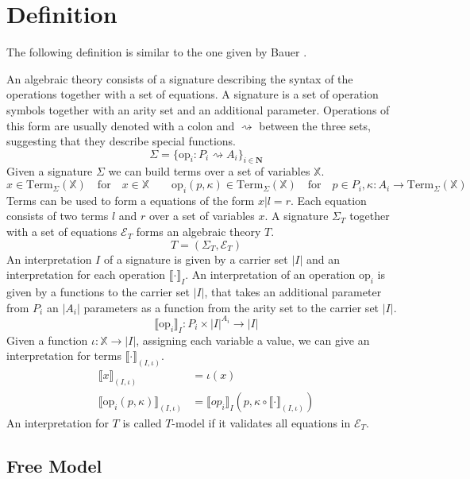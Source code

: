 \section{Definition}
\label{fo-definition}

The following definition is similar to the one given by Bauer
\cite{DBLP:journals/corr/abs-1807-05923}.

An algebraic theory consists of a signature describing the syntax of the
operations together with a set of equations.
A signature is a set of operation symbols together with an arity set and an
additional parameter.
Operations of this form are usually denoted with a colon and $\rightsquigarrow$
between the three sets, suggesting that they describe special functions.
\[
  \Sigma = \{ \mathrm{op}_i : P_i \rightsquigarrow A_i  \}_{i\in \mathbf{N}}
\]
Given a signature $\Sigma$ we can build terms over a set of variables $\mathbb{X}$.
\[
  x \in \mathrm{Term}_\Sigma(\mathbb{X}) \quad\text{for}\quad x\in\mathbb{X} \qquad
  \mathrm{op}_i(p, \kappa) \in \mathrm{Term}_\Sigma(\mathbb{X}) \quad\text{for}\quad
  p\in P_i, \kappa : A_i \rightarrow \mathrm{Term}_\Sigma(\mathbb{X})
\]
Terms can be used to form a equations of the form $x | l=r$.
Each equation consists of two terms $l$ and $r$ over a set of variables $x$.
A signature $\Sigma_T$ together with a set of equations $\mathcal{E}_T$ forms an
algebraic theory $T$.
\[
  T = (\Sigma_T, \mathcal{E}_T)
\]
An interpretation $I$ of a signature is given by a carrier set $|I|$ and an
interpretation for each operation $\lBrack\cdot\rBrack_I$.
An interpretation of an operation $\mathrm{op}_i$ is given by a functions to the
carrier set $|I|$, that takes an additional parameter from $P_i$ an $|A_i|$
parameters as a function from the arity set to the carrier set $|I|$.
\[
  \lBrack \mathrm{op}_i \rBrack_I : P_i \times |I|^{A_i} \rightarrow |I|
\]
Given a function $\iota : \mathbb{X} \rightarrow |I|$, assigning each variable
a value, we can give an interpretation for terms $\lBrack\cdot\rBrack_{(I,\iota)}$.
\begin{align*}
  \lBrack x \rBrack_{(I,\iota)} &= \iota(x) \\
  \lBrack \mathrm{op}_i(p, \kappa)\rBrack_{(I,\iota)} &= \lBrack op_i \rBrack_I (p, \kappa \circ \lBrack\cdot\rBrack_{(I, \iota)})
\end{align*}
An interpretation for $T$ is called $T$-model if it validates all equations in $\mathcal{E}_T$.

\subsection{Free Model}

